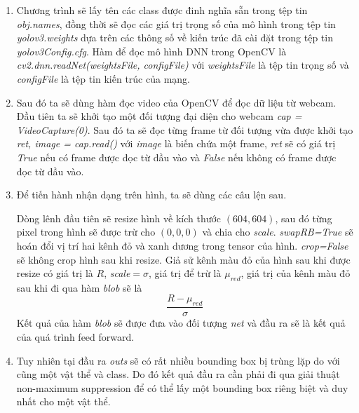 \begin{enumerate}
	\item Chương trình sẽ lấy tên các class được đinh nghĩa sẵn trong tệp tin \emph{obj.names}, đồng thời sẽ đọc các giá trị trọng số của mô hình trong tệp tin \emph{yolov3.weights} dựa trên các thông số về kiến trúc đã cài đặt trong tệp tin \emph{yolov3Config.cfg}. Hàm để đọc mô hình DNN trong OpenCV là \emph{cv2.dnn.readNet(weightsFile, configFile)} với \emph{weightsFile} là tệp tin trọng số và \emph{configFile} là tệp tin kiến trúc của mạng.
	
	\item Sau đó ta sẽ dùng hàm đọc video của OpenCV để đọc dữ liệu từ webcam. Đầu tiên ta sẽ khởi tạo một đối tượng đại diện cho webcam \emph{cap = VideoCapture(0)}. Sau đó ta sẽ đọc từng frame từ đối tượng vừa được khởi tạo \emph{ret, image = cap.read()} với \emph{image} là biến chứa một frame, \emph{ret} sẽ có giá trị \emph{True} nếu có frame được đọc từ đầu vào và \emph{False} nếu không có frame được đọc từ đầu vào.
	
	\item Để tiến hành nhận dạng trên hình, ta sẽ dùng các câu lện sau.

\noindent{}

	Dòng lênh đầu tiên sẽ resize hình về kích thước $(604, 604)$, sau đó từng pixel trong hình sẽ được trừ cho $(0, 0, 0)$ và chia cho \emph{scale}. \emph{swapRB=True} sẽ hoán đổi vị trí hai kênh đỏ và xanh dương trong tensor của hình. \emph{crop=False} sẽ không crop hình sau khi resize. Giả sử kênh màu đỏ của hình sau khi được resize có giá trị là $R$, \emph{scale}$=\sigma$, giá trị để trừ là ${\mu}_{red}$, giá trị của kênh màu đỏ sau khi đi qua hàm \emph{blob} sẽ là
\begin{equation}
	\frac{R-{\mu}_{red}}{\sigma}
\end{equation} 
	Kết quả của hàm \emph{blob} sẽ được đưa vào đối tượng \emph{net} và đầu ra sẽ là kết quả của quá trình feed forward.
	
	\item Tuy nhiên tại đầu ra \emph{outs} sẽ có rất nhiều bounding box bị trùng lặp do với cũng một vật thể và class. Do đó kết quả đầu ra cần phải đi qua giải thuật non-maximum suppression để có thể lấy một bounding box riêng biệt và duy nhất cho một vật thể.
	

\end{enumerate}
